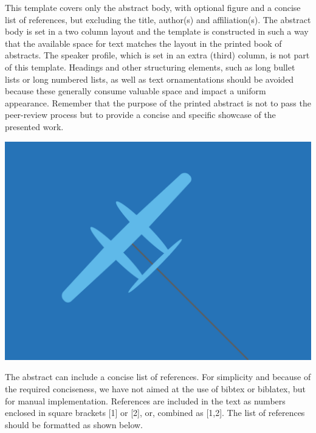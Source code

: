 {
\begin{multicols}{2}
%
%
%
%
This template covers only the abstract body, with optional figure and a concise list of references, but excluding the title, author(s) and affiliation(s). The abstract body is set in a two column layout and the template is constructed in such a way that the available space for text matches the layout in the printed book of abstracts. The speaker profile, which is set in an extra (third) column, is not part of this template. Headings and other structuring elements, such as long bullet lists or long numbered lists, as well as text ornamentations should be avoided because these generally consume valuable space and impact a uniform appearance. Remember that the purpose of the printed abstract is not to pass the peer-review process but to provide a concise and specific showcase of the presented work.

\begin{center}
\includegraphics[width=\columnwidth]{figures/AWEC01_Image.png}
\end{center}
\vspace{.2cm}

The abstract can include a concise list of references. For simplicity and because of the required conciseness, we have not aimed at the use of bibtex or biblatex, but for manual implementation. References are included in the text as numbers enclosed in square brackets [1] or [2], or, combined as [1,2]. The list of references should be formatted as shown below.
%
%

\vspace{\awereferencesskip}
%
%
%
%
\mbox{}
\end{multicols}
}

